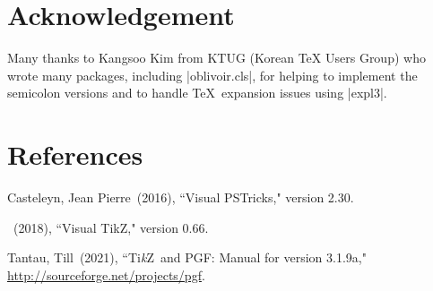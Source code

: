 \documentclass[a4paper,amsmath,chapter]{oblivoir}
\newcommand*\Tikz{Ti\textit{k}Z}
\let\TikZ\Tikz
\def\hpara{\hangpara{1.52em}{1}}
\begin{document}
\chapter*{Acknowledgement}

Many thanks to Kangsoo Kim from KTUG (Korean TeX Users Group) who wrote many packages, including |oblivoir.cls|, for helping to implement the semicolon versions and to handle \TeX\ expansion issues using |expl3|.

\chapter*{References}

\hpara{}Casteleyn, Jean Pierre~(2016), ``Visual PSTricks," version 2.30.

\hpara{}\uline{\hphantom{Casteleyn, Jean Pierre}}~(2018), ``Visual TikZ," version 0.66.

\hpara{}Tantau, Till~(2021), ``\TikZ\ and PGF: Manual for version 3.1.9a," \url{http://sourceforge.net/projects/pgf}.

\clearpage
\printindex
\end{document}
